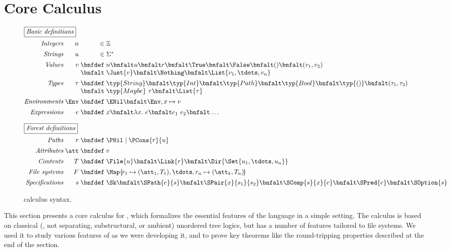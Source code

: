 \section{Core Calculus}
\label{sec:theory}

\begin{figure}
\[
\begin{array}{@{}r@{\;}r@{\;}r@{\;}l@{}}
\multicolumn{4}{@{}l}{\fbox{\textit{Basic definitions}}}\\[1.5ex]
\textit{Integers}     & n    & \in & \mathbb{Z}\\[1ex]
\textit{Strings}      & u    & \in & \Sigma^{\ast}\\[1ex]
\textit{Values}       & v    & \bnfdef & n \bnfalt u \bnfalt r \bnfalt \True \bnfalt \False \bnfalt () \bnfalt (v_1,v_2)\\
                      &      & \bnfalt &\Just{v} \bnfalt \Nothing \bnfalt \List{v_1,\tdots,v_n}\\[1ex]
\textit{Types}        & \tau & \bnfdef & \typ{String} \bnfalt \typ{Int} \bnfalt \typ{Path} \bnfalt \typ{Bool} \bnfalt \typ{()} \bnfalt (\tau_1,\tau_2) \\
                      &      & \bnfalt & \typ{Maybe}~\tau \bnfalt \List{\tau}\\[1ex]
\textit{Environments} & \Env & \bnfdef & \ENil \bnfalt \Env,x\mapsto v\\[1ex]
\textit{Expressions}  & e    & \bnfdef & x \bnfalt \lambda x.~e \bnfalt e_1~e_2 \bnfalt \dots \\[2.5ex]
%
\multicolumn{4}{@{}l}{\fbox{\textit{Forest definitions}}}\\[1.5ex]
\textit{Paths}          & r    & \bnfdef & \PNil \mid \PCons{r}{u}\\[1ex]
\textit{Attributes}     & \att & \bnfdef & v\\[1ex]
\textit{Contents}       & T    & \bnfdef & \File{u} \bnfalt \Link{r} \bnfalt \Dir{ \Set{u_1,\tdots,u_n} }\\[1ex]
\textit{File systems}   & F    & \bnfdef & \Map{ \! r_1 \mapsto (\att_1,T_1), \tdots, r_n \mapsto (\att_k,T_n) \! }\\[1ex]
\textit{Specifications} & s    & \bnfdef & \Sk \bnfalt \SPath{e}{s} \bnfalt \SPair{x}{s_1}{s_2} \bnfalt \SComp{s}{x}{e} \bnfalt \SPred{e} \bnfalt \SOption{s}
\end{array}
\]
\caption{\forest{} calculus syntax.}
\label{fig:csyntax}
\end{figure}

This section presents a core calculus for \forest{}, which formalizes
the essential features of the language in a simple setting. The
calculus is based on classical (\ie{}, not separating, substructural,
or ambient) unordered tree logics, but has a number of features
tailored to file systems. We used it to study various features of
\forest{} as we were developing it, and to prove key theorems like the
round-tripping properties described at the end of the section.

